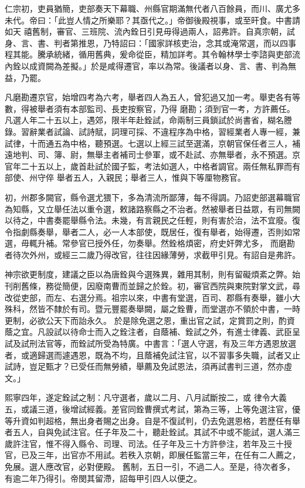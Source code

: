 \begin{pinyinscope}
 仁宗初，吏員猶簡，吏部奏天下幕職、州縣官期滿無代者八百餘員，而川、廣尤多未代。帝曰：「此豈人情之所樂耶？其亟代之。」帝御後殿視事，或至旰食。中書請如天
 禧舊制，審官、三班院、流內銓日引見毋得過兩人，詔弗許。自真宗朝，試身、言、書、判者第推恩，乃特詔曰：「國家詳核吏治，念其或淹常選，而以四事程其能。騰承統緒，循用舊典，爰命從臣，精加詳考。其令翰林學士李諮與吏部流內銓以成資闕為差擬。」於是咸得遷官，率以為常。後議者以身、言、書、判為無益，乃罷。



 凡磨勘遷京官，始增四考為六考，舉者四人為五人，曾犯過又加一考。舉吏各有等數，得被舉者須有本部監司、長吏按察官，乃得
 磨勘；須到官一考，方許薦任。凡選人年二十五以上，遇郊，限半年赴銓試，命兩制三員鎖試於尚書省，糊名謄錄。習辭業者試論、試詩賦，詞理可採、不違程序為中格，習經業者人專一經，兼試律，十而通五為中格，聽預選。七選以上經三試至選滿，京朝官保任者三人，補遠地判、司、簿、尉，無舉主者補司士參軍，或不赴試、亦無舉者，永不預選。京官年二十五以上，歲首赴試於國子監，考法如選人，中格者調官。兩任無私罪而有部使、州守倅
 舉者五人，入親民；舉者三人，惟與下等厘物務官。



 初，州郡多闕官，縣令選尤猥下，多為清流所鄙薄，每不得調。乃詔吏部選幕職官為知縣，又立舉任法以重令選，敕諸路察縣之不治者。然被舉者日益眾，有司無闕以待之，中書奏罷舉縣令法。未幾，有言親民之任輕，則有害於治，法不宜廢。復令指劇縣奏舉，舉者二人，必一人本部使，既居任，復有舉者，始得遷，否則如常選，毋輒升補。常參官已授外任，勿奏舉。然銓格煩密，府史奸弊尤多，
 而磨勘者待次外州，或經三二歲乃得改官，往往因緣薄勞，求截甲引見。有詔自是弗許。



 神宗欲更制度，建議之臣以為唐銓與今選殊異，雜用其制，則有留礙煩紊之弊。始刊削舊條，務從簡便，因廢南曹而並歸之於銓。初，審官西院與東院對掌文武，尋改從吏部，而左、右選分焉。祖宗以來，中書有堂選，百司、郡縣有奏舉，雖小大殊科，然皆不隸於有司。暨元豐罷奏舉闕，屬之銓曹，而堂選亦不領於中書，一時更制，必欲公天下而詒永久。
 於是除免選之恩，重出官之試，定賞罰之則，酌資蔭之宜。凡設試以待命士而入之銓注者，自蔭補、銓試之外，有進士律義、武臣呈試及試刑法官等，而銓試所受為特廣。中書言：「選人守選，有及三年方遇恩放選者，或適歸選而遽遇恩，既為不均，且蔭補免試注官，以不習事多失職，試者又止試詩，豈足甄才？已受任而無勞績，舉薦及免試恩法，須再試書判三道，然亦虛文。」



 熙寧四年，遂定銓試之制：凡守選者，歲以二月、八月試斷按二，或
 律令大義五，或議三道，後增試經義。差官同銓曹撰式考試，第為三等，上等免選注官，優等升資如判超格，無出身者賜之出身。自是不復試判，仍去免選恩格，若歷任有舉者五人，自與免試注官。任子年及二十，聽赴銓試。其試不中或不能試，選人滿三歲許注官，惟不得入縣令、司理、司法。任子年及三十方許參注，若年及三十授官，已及三年，出官亦不用試。若秩入京朝，即展任監當三年，在任有二人薦之，免展。選人應改官，必對便殿。
 舊制，五日一引，不過二人。至是，待次者多，有逾二年乃得引。帝閔其留滯，詔每甲引四人以便之。




\end{pinyinscope}
